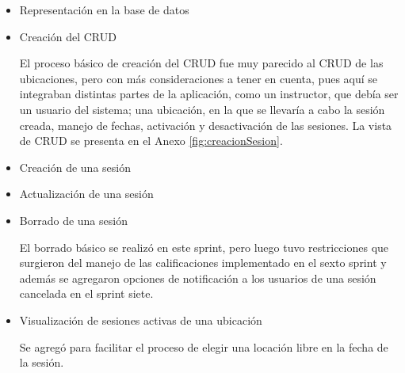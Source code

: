 \begin{itemize}


\item Representación en la base de datos

\item Creación del \gls{CRUD}

El proceso básico de creación del \gls{CRUD} fue muy parecido al \gls{CRUD} de las ubicaciones, pero con más consideraciones a tener en cuenta, pues aquí se integraban distintas partes de la aplicación, como un instructor, que debía ser un usuario del sistema; una ubicación, en la que se llevaría a cabo la sesión creada, manejo de fechas, activación y desactivación de las sesiones. La vista de \gls{CRUD} se presenta en el Anexo \ref{fig:creacionSesion}.

\item Creación de una sesión

\item Actualización de una sesión

\item Borrado de una sesión

El borrado básico se realizó en este sprint, pero luego tuvo restricciones que surgieron del manejo de las calificaciones implementado en el sexto sprint y además se agregaron opciones de notificación a los usuarios de una sesión cancelada en el sprint siete. 

\item Visualización de sesiones activas de una ubicación

Se agregó para facilitar el proceso de elegir una locación libre en la fecha de la sesión.

\end{itemize}


